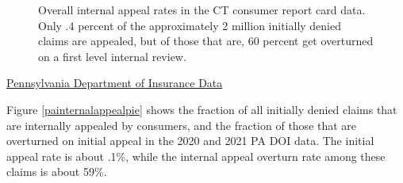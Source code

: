 \documentclass[12pt, a4paper,twoside]{report}
\theoremstyle{plain} %
\theoremstyle{definition} %
\theoremstyle{remark} %
\numberwithin{equation}{chapter}
\begin{document}
\begin{figure}[h!]
\begin{subfigure}[b]{0.49\textwidth}
			\end{subfigure}
			\caption{Overall internal appeal rates in the CT consumer report card data. Only .4 percent of the approximately 2 million initially denied claims are appealed, but of those that are, 60 percent get overturned on a first level internal review.}
			\label{ctinternalappealpie}
		\end{figure}
		
		
		\underline{Pennsylvania Department of Insurance Data}
		
		
		Figure \ref{painternalappealpie} shows the fraction of all initially denied claims that are internally appealed by consumers, and the fraction of those that are overturned on initial appeal in the 2020 and 2021 PA DOI data. The initial appeal rate is about .1\%, while the internal appeal overturn rate among these claims is about 59\%.
		
\end{document}
